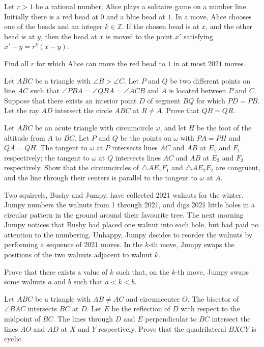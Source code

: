 \documentclass[11pt]{scrartcl}
\begin{document}
\begin{problem}[8866273454792491736]
	Let $r>1$ be a rational number. Alice plays a solitaire game on a number line. Initially there is a red bead at $0$ and a blue bead at $1$. In a move, Alice chooses one of the beads and an integer $k \in \mathbb{Z}$. If the chosen bead is at $x$, and the other bead is at $y$, then the bead at $x$ is moved to the point $x'$ satisfying $x'-y=r^k(x-y)$.

Find all $r$ for which Alice can move the red bead to $1$ in at most $2021$ moves.
\end{problem}
\begin{problem}[2477568457295629780]
	Let $ABC$ be a triangle with $\angle B > \angle C$. Let $P$ and $Q$ be two different points on line $AC$ such that $\angle PBA = \angle QBA = \angle ACB $ and $A$ is located between $P$ and $C$. Suppose that there exists an interior point $D$ of segment $BQ$ for which $PD=PB$. Let the ray $AD$ intersect the circle $ABC$ at $R \neq A$. Prove that $QB = QR$.
\end{problem}
\begin{problem}[942176258255049]
Let $ABC$ be an acute triangle with circumcircle $\omega$, and let $H$ be the foot of the altitude from $A$ to $\overline{BC}$. Let $P$ and $Q$ be the points on $\omega$ with $PA = PH$ and $QA = QH$. The tangent to $\omega$ at $P$ intersects lines $AC$ and $AB$ at $E_1$ and $F_1$ respectively; the tangent to $\omega$ at $Q$ intersects lines $AC$ and $AB$ at $E_2$ and $F_2$ respectively. Show that the circumcircles of $\triangle AE_1F_1$ and $\triangle AE_2F_2$ are congruent, and the line through their centers is parallel to the tangent to $\omega$ at $A$.
\end{problem}
\begin{problem}[669395675904242]
	Two squirrels, Bushy and Jumpy, have collected 2021 walnuts for the winter. Jumpy numbers the walnuts from 1 through 2021, and digs 2021 little holes in a circular pattern in the ground around their favourite tree. The next morning Jumpy notices that Bushy had placed one walnut into each hole, but had paid no attention to the numbering. Unhappy, Jumpy decides to reorder the walnuts by performing a sequence of 2021 moves. In the $k$-th move, Jumpy swaps the positions of the two walnuts adjacent to walnut $k$.

Prove that there exists a value of $k$ such that, on the $k$-th move, Jumpy swaps some walnuts $a$ and $b$ such that $a<k<b$.
\end{problem}
\begin{problem}[814823180113879]
	Let $ABC$ be a triangle with $AB \neq AC$ and circumcenter $O$. The bisector of $\angle BAC$ intersects $BC$ at $D$. Let $E$ be the reflection of $D$ with respect to the midpoint of $BC$. The lines through $D$ and $E$ perpendicular to $BC$ intersect the lines $AO$ and $AD$ at $X$ and $Y$ respectively. Prove that the quadrilateral $BXCY$ is cyclic.
\end{problem}
\end{document}
